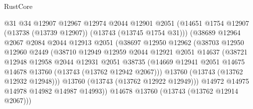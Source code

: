 \begin{lexlean}{RustCore}
\begin{coremodule}
                            @31
                            @34
                            @12907
                            @12967
                            @12974
                            @2044
                            @12901
                            @2051
                            (@14651
                              @1754
                              @12907
                              (@13738 (@13739 @12907))
                              (@13743 (@13745 @1754 @31)))
                            (@38689
                              @12964
                              @2067
                              @2084
                              @2044
                              @12913
                              @2051
                              (@38697
                                @12950
                                @12962
                                (@38703
                                  @12950
                                  @12960
                                  @2449
                                  (@38710
                                    @12949
                                    @12959
                                    @2044
                                    @12921
                                    @2051
                                    @14637
                                    (@38721
                                      @12948
                                      @12958
                                      @2044
                                      @12931
                                      @2051
                                      @38735
                                      (@14669
                                        @12941
                                        @2051
                                        @14675
                                        @14678
                                        @13760
                                        (@13743 (@13762 @12942 @2067)))
                                      @13760
                                      (@13743 (@13762 @12932 @12948)))
                                    @13760
                                    (@13743 (@13762 @12922 @12949)))
                                  @14972
                                  @14975
                                  @14978
                                  @14982
                                  @14987
                                  @14993))
                              @14678
                              @13760
                              (@13743 (@13762 @12914 @2067)))

\end{coremodule}
\end{lexlean}
